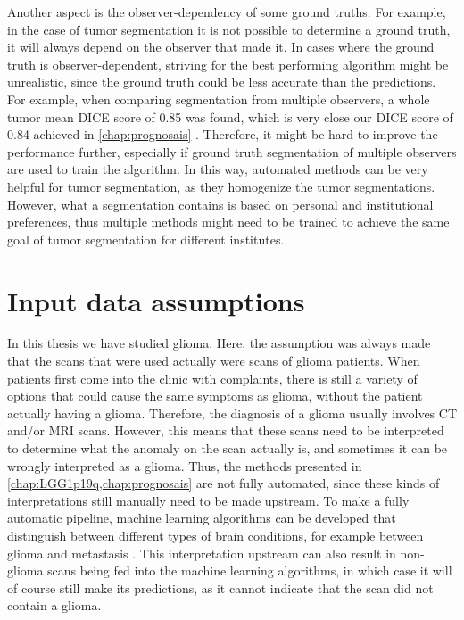 Another aspect is the observer-dependency of some ground truths.
For example, in the case of tumor segmentation it is not possible to determine a  ground truth, it will always depend on the observer that made it.
In cases where the ground truth is observer-dependent, striving for the best performing algorithm might be unrealistic, since the ground truth could be less accurate than the predictions.
For example, when comparing segmentation from multiple observers, a whole \gls{tumor} mean DICE score of 0.85 was found, which is very close our DICE score of 0.84 achieved in \cref{chap:prognosais} \autocite{menze2015brats}.
Therefore, it might be hard to improve the performance further, especially if ground truth segmentation of multiple observers are used to train the algorithm.
In this way, automated methods can be very helpful for \gls{tumor} segmentation, as they homogenize the \gls{tumor} segmentations.
However, what a segmentation contains is based on personal and institutional preferences, thus multiple methods might need to be trained to achieve the same goal of \gls{tumor} segmentation for different institutes.

\section{Input data assumptions}

In this thesis we have studied glioma.
Here, the assumption was always made that the scans that were used actually were scans of glioma patients.
When patients first come into the clinic with complaints, there is still a variety of options that could cause the same symptoms as glioma, without the patient actually having a glioma.
Therefore, the diagnosis of a glioma usually involves \gls{CT} and/or \gls{MRI} scans.
However, this means that these scans need to be interpreted to determine what the anomaly on the scan actually is, and sometimes it can be wrongly interpreted as a glioma.
Thus, the methods presented in \cref{chap:LGG1p19q,chap:prognosais} are not fully automated, since these kinds of interpretations still manually need to be made upstream.
To make a fully automatic pipeline, machine learning algorithms can be developed that distinguish between different types of brain conditions, for example between glioma and metastasis \autocite{chen2019metastatic}.
This interpretation upstream can also result in non-glioma scans being fed into the machine learning algorithms, in which case it will of course still make its predictions, as it cannot indicate that the scan did not contain a glioma.

